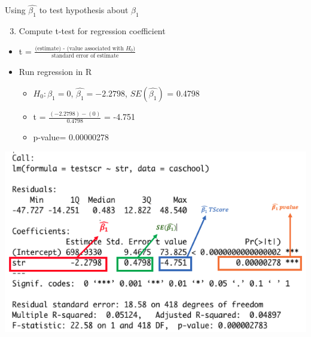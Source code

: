 \documentclass[
  8pt,
  ignorenonframetext,
  dvipsnames]{beamer}
\providecommand{\tightlist}{%
  \setlength{\itemsep}{0pt}\setlength{\parskip}{0pt}}
\let\olditem\item
\renewcommand{\item}{%
  \olditem\vspace{4pt}
}
\begin{document}
\begin{frame}{Using \(\hat{\beta_1}\) to test hypothesis about
\(\beta_1\)}
\protect\hypertarget{using-hatbeta_1-to-test-hypothesis-about-beta_1-1}{}

\begin{enumerate}
\setcounter{enumi}{2}
\tightlist
\item
  Compute t-test for regression coefficient
\end{enumerate}

\begin{itemize}
\tightlist
\item
  t =
  \(\frac {\text{(estimate) - (value associated with }H_{0})} {\text{standard error of estimate}}\)
\item
  Run regression in R

  \begin{itemize}
  \tightlist
  \item
    \(H_0: \beta_1 = 0\), \(\hat{\beta_1}=-2.2798\),
    \(SE(\hat{\beta_1})\) = 0.4798
  \item
    t = \(\frac{(-2.2798) - (0)}{0.4798}\) = -4.751
  \item
    p-value= 0.00000278
  \end{itemize}
\end{itemize}

\includegraphics{annotated_output.png}

\end{frame}
\end{document}
